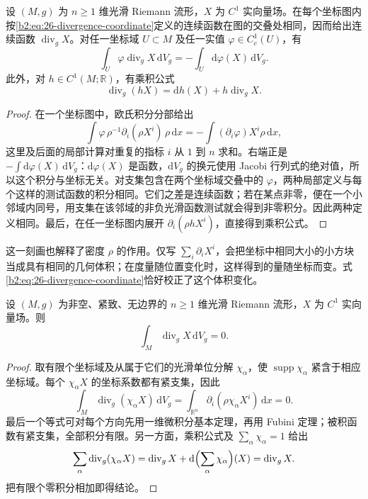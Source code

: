 \begin{proposition}[散度的坐标无关性]
\label{b2:prop:26-divergence-invariant}
设 \((M,g)\) 为 \(n\geq1\) 维光滑 Riemann 流形，\(X\) 为 \(C^1\) 实向量场。在每个坐标图内按\eqref{b2:eq:26-divergence-coordinate}定义的连续函数在图的交叠处相同，因而给出连续函数 \(\operatorname{div}_gX\)。对任一坐标域 \(U\subset M\) 及任一实值 \(\varphi\in C_c^1(U)\)，有
\[
 \int_U\varphi\operatorname{div}_gX\,\mathrm dV_g
 =-\int_U\mathrm d\varphi(X)\,\mathrm dV_g.
\]
此外，对 \(h\in C^1(M;\mathbb R)\)，有乘积公式
\[
 \operatorname{div}_g(hX)
 =\mathrm dh(X)+h\operatorname{div}_gX.
\]
\end{proposition}
\begin{proof}
在一个坐标图中，欧氏积分分部给出
\[
 \int \varphi\,\rho^{-1}\partial_i(\rho X^i)\,\rho\,\mathrm dx
 =-\int (\partial_i\varphi)X^i\rho\,\mathrm dx,
\]
这里及后面的局部计算对重复的指标 \(i\) 从 \(1\) 到 \(n\) 求和。右端正是 \(-\int\mathrm d\varphi(X)\,\mathrm dV_g\)：\(\mathrm d\varphi(X)\) 是函数，\(\mathrm dV_g\) 的换元使用 Jacobi 行列式的绝对值，所以这个积分与坐标无关。对支集包含在两个坐标域交叠中的 \(\varphi\)，两种局部定义与每个这样的测试函数的积分相同。它们之差是连续函数；若在某点非零，便在一个小邻域内同号，用支集在该邻域的非负光滑函数测试就会得到非零积分。因此两种定义相同。最后，在任一坐标图内展开 \(\partial_i(\rho hX^i)\)，直接得到乘积公式。
\end{proof}

这一刻画也解释了密度 \(\rho\) 的作用。仅写 \(\sum_i\partial_iX^i\)，会把坐标中相同大小的小方块当成具有相同的几何体积；在度量随位置变化时，这样得到的量随坐标而变。式\eqref{b2:eq:26-divergence-coordinate}恰好校正了这个体积变化。

\begin{proposition}[无边界紧流形上的散度积分]
\label{b2:prop:26-divergence-integral}
设 \((M,g)\) 为非空、紧致、无边界的 \(n\geq1\) 维光滑 Riemann 流形，\(X\) 为 \(C^1\) 实向量场。则
\[
 \int_M\operatorname{div}_gX\,\mathrm dV_g=0.
\]
\end{proposition}
\begin{proof}
取有限个坐标域及从属于它们的光滑单位分解 \(\chi_\alpha\)，使 \(\operatorname{supp}\chi_\alpha\) 紧含于相应坐标域。每个 \(\chi_\alpha X\) 的坐标系数都有紧支集，因此
\[
 \int_M\operatorname{div}_g(\chi_\alpha X)\,\mathrm dV_g
 =\int_{\mathbb R^n}\partial_i(\rho\chi_\alpha X^i)\,\mathrm dx=0.
\]
最后一个等式可对每个方向先用一维微积分基本定理，再用 Fubini 定理；被积函数有紧支集，全部积分有限。另一方面，乘积公式及 \(\sum_\alpha\chi_\alpha=1\) 给出
\[
 \sum_\alpha\operatorname{div}_g(\chi_\alpha X)
 =\operatorname{div}_gX
   +\mathrm d\Bigl(\sum_\alpha\chi_\alpha\Bigr)(X)
 =\operatorname{div}_gX.
\]
把有限个零积分相加即得结论。
\end{proof}

